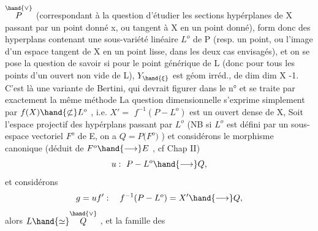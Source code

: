 
$\overset{\hand{\vee}}{P}$ (correspondant à la question d'étudier les sections hypérplanes de X
passant par un point donné x, ou tangent à X en un point  donné),
form donc des hyperplans contenant une sous-variété linéaire $L^{o}$ de P
(resp. un point,  ou l'image d'un espace tangent de X en un point lisse,
dans les deux cas envisagés), et on se pose la question de savoir si
pour le point générique \hand{$\xi$} de L  (donc pour tous les points d'un ouvert
non vide de L),  $Y_{\hand{\xi}}$  est  géom irréd., de
dim  dim X -1.   C'est là une variante  de Bertini, qui devrait figurer
dans  le n°  et se traite par exactement la même méthode  La question
dimensionnelle s'exprime simplement par  $f(X)\hand{\not\subset} L^{o}$ , 
i.e.  $X' =$  $f^{-1}(P - L^{o})$   est un ouvert dense de X, 
Soit  l'espace projectif des hypérplans passant par $L^{o}$  (NB si  $L^{o}$ est
défini par un sous-espace vectoriel $F^{o}$ de E,  on a   $Q = P($$F^{o})$ ) et
considérons le morphisme  canonique  (déduit de  $F^{o}\hand{\longrightarrow} E$ , cf
Chap II)
\[ u :\ P - L^{o} \hand{\longrightarrow} Q, \]
et considérons
\[ g = u f' :\quad f^{-1}(P - L^{o}) = X' \hand{\longrightarrow} Q , \]
alors   $L \hand{\simeq} \overset{\hand{\vee}}{Q}$ ,  et la famille des
